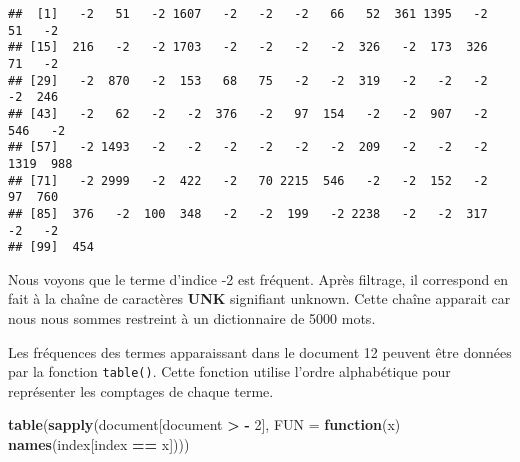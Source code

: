 \documentclass[]{article}
\newenvironment{Shaded}{\begin{snugshade}}{\end{snugshade}}
\newcommand{\KeywordTok}[1]{\textcolor[rgb]{0.13,0.29,0.53}{\textbf{#1}}}
\newcommand{\DataTypeTok}[1]{\textcolor[rgb]{0.13,0.29,0.53}{#1}}
\newcommand{\DecValTok}[1]{\textcolor[rgb]{0.00,0.00,0.81}{#1}}
\newcommand{\StringTok}[1]{\textcolor[rgb]{0.31,0.60,0.02}{#1}}
\newcommand{\ControlFlowTok}[1]{\textcolor[rgb]{0.13,0.29,0.53}{\textbf{#1}}}
\newcommand{\OperatorTok}[1]{\textcolor[rgb]{0.81,0.36,0.00}{\textbf{#1}}}
\newcommand{\NormalTok}[1]{#1}
\begin{document}
\begin{Shaded}
\end{Shaded}

\begin{verbatim}
##  [1]   -2   51   -2 1607   -2   -2   -2   66   52  361 1395   -2   51   -2
## [15]  216   -2   -2 1703   -2   -2   -2   -2  326   -2  173  326   71   -2
## [29]   -2  870   -2  153   68   75   -2   -2  319   -2   -2   -2   -2  246
## [43]   -2   62   -2   -2  376   -2   97  154   -2   -2  907   -2  546   -2
## [57]   -2 1493   -2   -2   -2   -2   -2   -2  209   -2   -2   -2 1319  988
## [71]   -2 2999   -2  422   -2   70 2215  546   -2   -2  152   -2   97  760
## [85]  376   -2  100  348   -2   -2  199   -2 2238   -2   -2  317   -2   -2
## [99]  454
\end{verbatim}

Nous voyons que le terme d'indice -2 est fréquent. Après filtrage, il
correspond en fait à la chaîne de caractères \textbf{UNK} signifiant
unknown. Cette chaîne apparait car nous nous sommes restreint à un
dictionnaire de 5000 mots.

Les fréquences des termes apparaissant dans le document 12 peuvent être
données par la fonction \texttt{table()}. Cette fonction utilise l'ordre
alphabétique pour représenter les comptages de chaque terme.

\begin{Shaded}
\begin{Highlighting}[]
  \KeywordTok{table}\NormalTok{(}\KeywordTok{sapply}\NormalTok{(document[document }\OperatorTok{>}\StringTok{ }\OperatorTok{-}\StringTok{ }\DecValTok{2}\NormalTok{], }\DataTypeTok{FUN =} \ControlFlowTok{function}\NormalTok{(x) }\KeywordTok{names}\NormalTok{(index[index }\OperatorTok{==}\StringTok{ }\NormalTok{x])))}
\end{Highlighting}
\end{Shaded}
\end{document}
